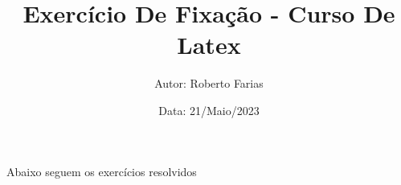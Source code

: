 \documentclass[a4paper,12pt]{article}
\title{\textbf{Exercício De Fixação - Curso De Latex}}
\author{Autor: Roberto Farias}
\date{Data: 21/Maio/2023}
\begin{document}
\maketitle %

Abaixo seguem os exercícios resolvidos
\end{document}
